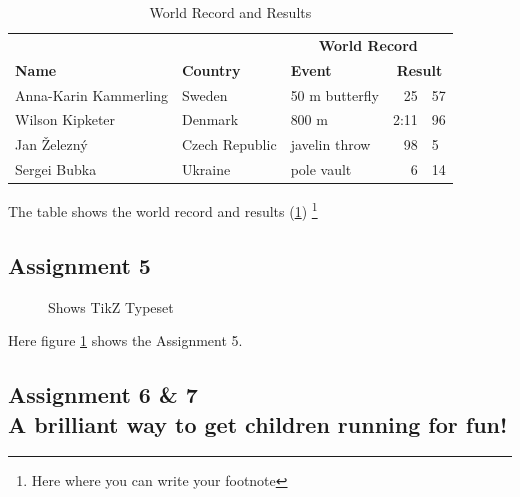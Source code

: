 \documentclass{article}
\begin{document}
\begin{table}[htbp]
	\centering
	\begin{tabular}{l l l r@{.}l}
		\hline 
		& & \multicolumn{3}{c}{\textbf{World Record}} \\ 
		\cline{3-5}
		\bfseries{Name} & \bfseries{Country} & \bfseries{Event} & \multicolumn{2}{c}{\bfseries{Result}}				 \\ 
		\hline Anna-Karin Kammerling & Sweden & 50 m butterfly & 25&57 \\ 
		Wilson Kipketer & Denmark & 800 m & 2:11&96 \\ 
		Jan 
		\v{Z}elezný & Czech Republic & javelin throw & 98&5 \\ 
		Sergei Bubka & Ukraine & pole vault & 6&14 \\ 
		\hline 
	\end{tabular}  
	\caption{World Record and Results} 
	\label{Table1} 
	\end{table} 
	The table shows the world record and results (\ref{Table1})
	\footnote{Here where you can write your footnote}
	
	
 
	
\subsection*{Assignment 5}
\begin{figure}[h]
\begin{center} 
\end{center}
\caption{ Shows TikZ Typeset }
	\label{f:tikz}
\end{figure}
Here figure \ref{f:tikz} shows the Assignment 5.


\subsection{Assignment 6 \& 7\\A brilliant way to get children running for fun!}
 
\end{document}
